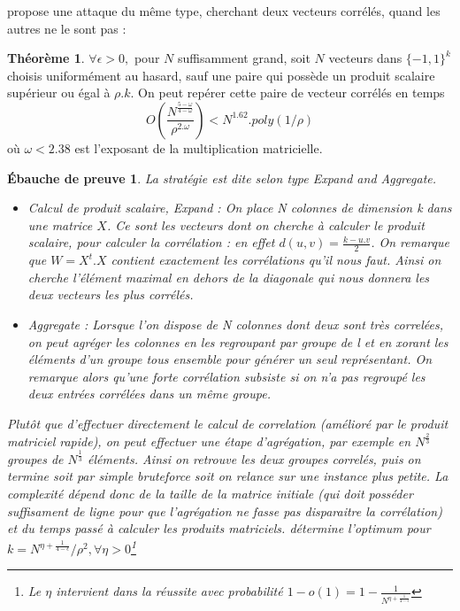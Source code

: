 \documentclass{article}		%
\theoremstyle{definition}
\newtheorem{theo}{Théorème}
\theoremstyle{plain}
\newtheorem{intui}{Ébauche de preuve}
\theoremstyle{plain}
\theoremstyle{plain}
\theoremstyle{plain}
\begin{document}
 \cite{Valiant} propose une attaque du même type, cherchant deux vecteurs
corrélés, quand les autres ne le sont pas :
\begin{framed}

\begin{theo}
$\forall \epsilon > 0,$ pour $N$ suffisamment grand, soit $N$
vecteurs dans $\{-1,1\}^k$ choisis uniformément au hasard, sauf une paire
qui possède un produit scalaire supérieur ou égal à $\rho.k$. On peut
repérer cette paire de vecteur corrélés en temps
$$O(\frac{N^{\frac{5-\omega}{4-\omega}}}{\rho^{2.\omega}})<N^{1.62}.poly(1/\rho)$$
où $\omega < 2.38$ est l'exposant de la multiplication matricielle.
\end{theo}
\begin{intui}
La stratégie est dite selon \cite{Valiant} type \emph{Expand and Aggregate}.

\begin{itemize}
\item \emph{Calcul de produit scalaire, Expand :} On place N colonnes de
dimension k dans une matrice $X$. Ce sont les vecteurs dont on cherche à
calculer le produit scalaire, pour calculer la corrélation : en effet
$d(u,v)=\frac{k-u.v}{2}$. On remarque que $W=X^t.X$ contient exactement
les corrélations qu'il nous faut. Ainsi on cherche l'élément maximal en
dehors de la diagonale qui nous donnera les deux vecteurs les plus
corrélés.
\item \emph{Aggregate :} Lorsque l'on dispose de N colonnes dont deux sont
très correlées, on peut agréger les colonnes en les regroupant par
groupe de l et en xorant les éléments d'un groupe tous ensemble pour
générer un  seul représentant. On remarque alors qu'une forte corrélation subsiste si on n'a pas
regroupé les deux entrées corrélées dans un même groupe. 
\end{itemize} 
Plutôt que d'effectuer directement le calcul de correlation (amélioré par
le produit matriciel rapide), on peut effectuer une étape d'agrégation,
par exemple en $N^{\frac{2}{3}}$ groupes de $N^{\frac{1}{3}}$ éléments.
Ainsi on retrouve les deux groupes correlés, puis on termine soit par simple
bruteforce soit on relance sur une instance plus petite.
La complexité dépend donc de la taille de la matrice
initiale (qui doit posséder suffisament de ligne pour que l'agrégation ne
fasse pas disparaitre la corrélation) et du temps passé à calculer les
produits matriciels. \cite{Valiant} détermine l'optimum pour
$k=N^{\eta+\frac{1}{4-\epsilon}}/\rho^2, \forall \eta>0$\footnote{Le $\eta$ intervient
dans la réussite avec probabilité
$1-o(1)=1-\frac{1}{N^{\eta+\frac{1}{4-\epsilon}}}$}
\end{intui}
\end{framed}
\end{document}
